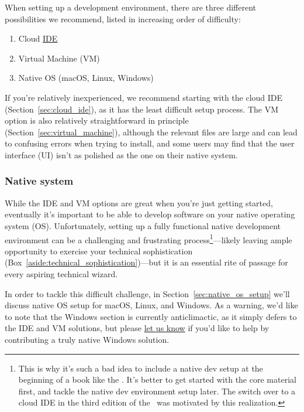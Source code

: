 When setting up a development environment, there are three different possibilities we recommend, listed in increasing order of difficulty:

\begin{enumerate}
  \item Cloud \href{https://en.wikipedia.org/wiki/Integrated_development_environment}{IDE}
  \item Virtual Machine (VM)
  \item Native OS (macOS, Linux, Windows)
\end{enumerate}

If you're relatively inexperienced, we recommend starting with the cloud IDE (Section~\ref{sec:cloud_ide}), as it has the least difficult setup process. The VM option is also relatively straightforward in principle (Section~\ref{sec:virtual_machine}), although the relevant files are large and can lead to confusing errors when trying to install, and some users may find that the user interface (UI) isn't as polished as the one on their native system.

\subsubsection{Native system} %
\label{sec:native_system}

While the IDE and VM options are great when you're just getting started, eventually it's important to be able to develop software on your native operating system (OS)\@. Unfortunately, setting up a fully functional native development environment can be a challenging and frustrating process\footnote{This is why it's such a bad idea to include a native dev setup at the beginning of a book like the \rortb. It's better to get started with the core material first, and tackle the native dev environment setup later. The switch over to a cloud IDE in the third edition of the \rortb\ was motivated by this realization.}---likely leaving ample opportunity to exercise your technical sophistication (Box~\ref{aside:technical_sophistication})---but it is an essential rite of passage for every aspiring technical wizard.

In order to tackle this difficult challenge, in Section~\ref{sec:native_os_setup} we'll discuss native OS setup for macOS, Linux, and Windows. As a warning, we'd like to note that the Windows section is currently anticlimactic, as it simply defers to the IDE and VM solutions, but please \href{mailto:support@learnenough.com}{let us know} if you'd like to help by contributing a truly native Windows solution.

